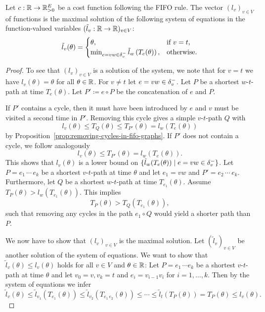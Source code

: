 \begin{proposition}
    Let $c:\mathbb{R}\rightarrow\mathbb{R}_{>0}^E$ be a cost function following the FIFO rule.
    The vector $(l_v)_{v\in V}$ of functions is the maximal solution of the following system of equations in the function-valued variables $(\tilde l_v: \mathbb{R} \rightarrow \mathbb{R})_{v\in V}$:
    \[
        \tilde l_v(\theta) = \begin{cases}
            \theta, &\text{if $v = t$}, \\
            \min_{\substack{
                e=vw\in\delta^-_{v}               
            }} \tilde{l}_w\left(
                T_e(\theta)
            \right), &\text{otherwise}.
        \end{cases}
    \]
\end{proposition}
\begin{proof}
    To see that $(l_v)_{v\in V}$ is a solution of the system, we note that for $v = t$ we have $l_v(\theta) = \theta$ for all $\theta\in\mathbb{R}$.
    For $v\neq t$ let $e=vw\in\delta^-_{v}$.
    Let $P$ be a shortest $w$-$t$-path at time $T_{e}(\theta)$.
    Let $P'\coloneqq e\circ P$ be the concatenation of $e$ and $P$.

    If $P'$ contains a cycle, then it must have been introduced by $e$ and $v$ must be visited a second time in $P'$.
    Removing this cycle gives a simple $v$-$t$-path $Q$ with 
    \[
        l_{v}(\theta) \leq T_{Q}(\theta)\leq T_{P'}(\theta) = l_{w}(T_{e}(\theta))
    \]
    by Proposition~\ref{prop:removing-cycles-in-fifo-graphs}.
    If $P'$ does not contain a cycle, we follow analogously
    \[
        l_{v}(\theta) \leq T_{P'}(\theta) = l_{w}(T_{e}(\theta)).
    \]
    This shows that $l_v(\theta)$ is a lower bound on $\{ \tilde l_w(
        T_{e}(\theta)
    ) \mid e=vw\in\delta^-_{v}  \}$.
    Let $P = e_1\, \cdots\, e_k$ be a shortest $v$-$t$-path at time $\theta$ and let $e_1=vw$ and $P' = e_2\,\cdots\,e_k$.
    Furthermore, let $Q$ be a shortest $w$-$t$-path at time $T_{e_1}(\theta)$.
    Assume $T_{P}(\theta) > l_{w}(T_{e_1}(\theta))$.
    This implies
    \[
        T_{P}(\theta) > 
        T_{Q}(T_{e_1}(\theta)),
    \]
    such that removing any cycles in the path $e_1\circ Q$ would yield a shorter path than $P$.

    We now have to show that $(l_v)_{v\in V}$ is the maximal solution.
    Let $(\tilde l_v)_{v\in V}$ be another solution of the system of equations.
    We want to show that $\tilde l_v(\theta) \leq l_v(\theta)$ holds for all $v\in V$ and $\theta\in\mathbb{R}$:
    Let $P = e_1 \,\cdots e_k$ be a shortest $v$-$t$-path at time $\theta$ and let $v_0 = v, v_k= t$ and $e_i = v_{i-1} v_i$ for $i=1,\dots,k$.
    Then by the system of equations we infer \[
        \tilde l_{v}(\theta) \leq \tilde l_{v_1}(T_{e_1}(\theta)) \leq \tilde l_{v_2}(T_{e_1\,e_2} (\theta)) \leq \cdots \leq \tilde l_t(T_P(\theta)) = T_P(\theta) \leq l_v(\theta).
    \]
\end{proof}

